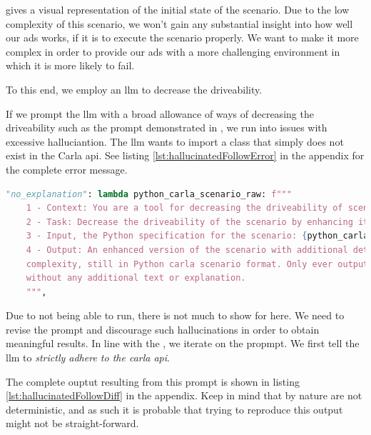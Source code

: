  gives a visual representation of the initial state of the scenario.
Due to the low complexity of this scenario, we won't gain any substantial insight into how well our
\acrshort{ads} works, if it is to execute the scenario properly. We want to make it more complex in
order to provide our \acrshort{ads} with a more challenging environment in which it is more likely
to fail.

To this end, we employ an \acrshort{llm} to decrease the driveability.

If we prompt the \acrshort{llm} with a broad allowance of ways of decreasing the driveability such
as the prompt demonstrated in , we run into issues with excessive
halluciantion. The \acrshort{llm} wants to import a class that simply does not exist in the Carla
\acrshort{api}. See listing \ref{lst:hallucinatedFollowError} in the  appendix for the complete error message.


\begin{lstlisting}[language=python, label={lst:basicPrompt}, caption={The most basic prompt first used in the experiments. This leads to excessive halluciantion.}]
            "no_explanation": lambda python_carla_scenario_raw: f"""
    1 - Context: You are a tool for decreasing the driveability of scenarios in the driving simulator Carla.
    2 - Task: Decrease the driveability of the scenario by enhancing it with more details and complexity.
    3 - Input, the Python specification for the scenario: {python_carla_scenario_raw}
    4 - Output: An enhanced version of the scenario with additional details and
    complexity, still in Python carla scenario format. Only ever output the code,
    without any additional text or explanation.
    """,
\end{lstlisting}


Due to not being able to run, there is not much to show for here. We need to revise the prompt and
discourage such hallucinations in order to obtain meaningful results. In line with the
, we iterate on the propmpt. We first tell the \acrshort{llm} to
\emph{strictly adhere to the carla \acrshort{api}}.

The complete ouptut resulting from this prompt is shown in listing \ref{lst:hallucinatedFollowDiff}
in the appendix.
Keep in mind that  by nature are not deterministic, and as such it is probable
that trying to reproduce this output might not be straight-forward.

